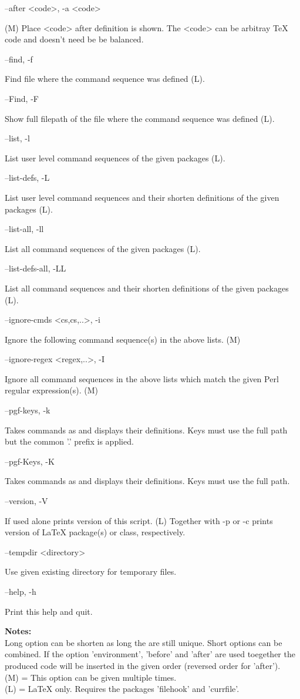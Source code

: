 \documentclass{ydoc}
\newenvironment{options}{%
    \def\cstart{\begingroup\ttfamily\par\noindent\ignorespaces}%
    \def\csep{\endgroup\begingroup\list {}{}\item \relax}%
    \def\cend{\endlist\par\medskip\endgroup\cstart}%
    \cstart
}{%
    \endgroup
}
\begin{document}
\begin{options}
  --after  \MacroArgs<code>, -a \MacroArgs<code>     \csep (M) Place \MacroArgs<code> after definition is shown.
                                                       The \MacroArgs<code> can be arbitray TeX code and doesn't need be be balanced.\cend
  --find, -f                                         \csep Find file where the command sequence was defined (L).\cend
  --Find, -F                                         \csep Show full filepath of the file where the command sequence was defined (L).\cend
  --list, -l                                         \csep List user level command sequences of the given packages (L).\cend
  --list-defs, -L                                    \csep List user level command sequences and their shorten definitions of the given packages (L).\cend
  --list-all, -ll                                    \csep List all command sequences of the given packages (L).\cend
  --list-defs-all, -LL                               \csep List all command sequences and their shorten definitions of the given packages (L).\cend
  --ignore-cmds \MacroArgs<cs,cs,..>,  -i            \csep Ignore the following command sequence(s) in the above lists. (M)\cend
  --ignore-regex \MacroArgs<regex,..>, -I            \csep Ignore all command sequences in the above lists which match the given Perl regular expression(s). (M)\cend
  --pgf-keys, -k                                     \csep Takes commands as  and displays their definitions. Keys must use the full path but the common '.\@cmd' prefix is applied.\cend
  --pgf-Keys, -K                                     \csep Takes commands as  and displays their definitions. Keys must use the full path.\cend
  --version, -V                                      \csep If used alone prints version of this script.
                                                       (L) Together with -p or -c prints version of LaTeX package(s) or class, respectively.\cend
  --tempdir <directory>                              \csep Use given existing directory for temporary files.\cend
  --help, -h                                         \csep Print this help and quit.\cend
\end{options}

\noindent \textbf{Notes:}\\
 Long option can be shorten as long the are still unique.  Short options can be combined.
 If the option 'environment', 'before' and 'after' are used toegether the
 produced code will be inserted in the given order (reversed order for 'after').\\
 (M) = This option can be given multiple times.\\
 (L) = LaTeX only. Requires the packages 'filehook' and 'currfile'.
\end{document}

